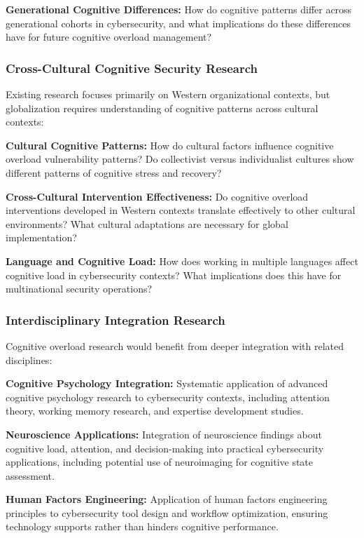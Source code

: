 \documentclass[11pt,a4paper]{article}
\begin{document}
\textbf{Generational Cognitive Differences:} How do cognitive patterns differ across generational cohorts in cybersecurity, and what implications do these differences have for future cognitive overload management?

\subsubsection{Cross-Cultural Cognitive Security Research}

Existing research focuses primarily on Western organizational contexts, but globalization requires understanding of cognitive patterns across cultural contexts:

\textbf{Cultural Cognitive Patterns:} How do cultural factors influence cognitive overload vulnerability patterns? Do collectivist versus individualist cultures show different patterns of cognitive stress and recovery?

\textbf{Cross-Cultural Intervention Effectiveness:} Do cognitive overload interventions developed in Western contexts translate effectively to other cultural environments? What cultural adaptations are necessary for global implementation?

\textbf{Language and Cognitive Load:} How does working in multiple languages affect cognitive load in cybersecurity contexts? What implications does this have for multinational security operations?

\subsubsection{Interdisciplinary Integration Research}

Cognitive overload research would benefit from deeper integration with related disciplines:

\textbf{Cognitive Psychology Integration:} Systematic application of advanced cognitive psychology research to cybersecurity contexts, including attention theory, working memory research, and expertise development studies.

\textbf{Neuroscience Applications:} Integration of neuroscience findings about cognitive load, attention, and decision-making into practical cybersecurity applications, including potential use of neuroimaging for cognitive state assessment.

\textbf{Human Factors Engineering:} Application of human factors engineering principles to cybersecurity tool design and workflow optimization, ensuring technology supports rather than hinders cognitive performance.
\end{document}
